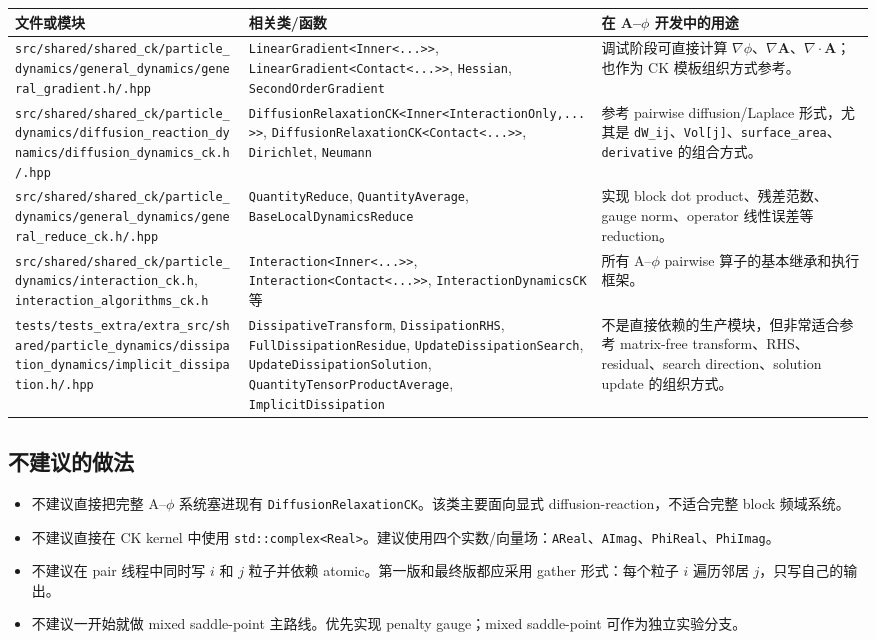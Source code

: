 \documentclass[UTF8,a4paper,11pt]{ctexart}
\newcommand{\code}[1]{\texttt{#1}}
\begin{document}
\begin{longtable}{p{}p{}p{}}
\toprule
文件或模块 & 相关类/函数 & 在 A--$\phi$ 开发中的用途 \\
\midrule
\code{src/shared/shared\_ck/particle\_dynamics/general\_dynamics/general\_gradient.h/.hpp}
& \code{LinearGradient<Inner<...>>}, \code{LinearGradient<Contact<...>>}, \code{Hessian}, \code{SecondOrderGradient}
& 调试阶段可直接计算 $\nabla\phi$、$\nabla \bm A$、$\nabla\cdot\bm A$；也作为 CK 模板组织方式参考。 \\
\midrule
\code{src/shared/shared\_ck/particle\_dynamics/diffusion\_reaction\_dynamics/diffusion\_dynamics\_ck.h/.hpp}
& \code{DiffusionRelaxationCK<Inner<InteractionOnly,...>>}, \code{DiffusionRelaxationCK<Contact<...>>}, \code{Dirichlet}, \code{Neumann}
& 参考 pairwise diffusion/Laplace 形式，尤其是 \code{dW\_ij}、\code{Vol[j]}、\code{surface\_area}、\code{derivative} 的组合方式。 \\
\midrule
\code{src/shared/shared\_ck/particle\_dynamics/general\_dynamics/general\_reduce\_ck.h/.hpp}
& \code{QuantityReduce}, \code{QuantityAverage}, \code{BaseLocalDynamicsReduce}
& 实现 block dot product、残差范数、gauge norm、operator 线性误差等 reduction。 \\
\midrule
\code{src/shared/shared\_ck/particle\_dynamics/interaction\_ck.h}, \code{interaction\_algorithms\_ck.h}
& \code{Interaction<Inner<...>>}, \code{Interaction<Contact<...>>}, \code{InteractionDynamicsCK} 等
& 所有 A--$\phi$ pairwise 算子的基本继承和执行框架。 \\
\midrule
\code{tests/tests\_extra/extra\_src/shared/particle\_dynamics/dissipation\_dynamics/implicit\_dissipation.h/.hpp}
& \code{DissipativeTransform}, \code{DissipationRHS}, \code{FullDissipationResidue}, \code{UpdateDissipationSearch}, \code{UpdateDissipationSolution}, \code{QuantityTensorProductAverage}, \code{ImplicitDissipation}
& 不是直接依赖的生产模块，但非常适合参考 matrix-free transform、RHS、residual、search direction、solution update 的组织方式。 \\
\bottomrule
\end{longtable}

\subsection{不建议的做法}

\begin{itemize}
  \item 不建议直接把完整 A--$\phi$ 系统塞进现有 \code{DiffusionRelaxationCK}。该类主要面向显式 diffusion-reaction，不适合完整 block 频域系统。
  \item 不建议直接在 CK kernel 中使用 \code{std::complex<Real>}。建议使用四个实数/向量场：\code{AReal}、\code{AImag}、\code{PhiReal}、\code{PhiImag}。
  \item 不建议在 pair 线程中同时写 $i$ 和 $j$ 粒子并依赖 atomic。第一版和最终版都应采用 gather 形式：每个粒子 $i$ 遍历邻居 $j$，只写自己的输出。
  \item 不建议一开始就做 mixed saddle-point 主路线。优先实现 penalty gauge；mixed saddle-point 可作为独立实验分支。
\end{itemize}
\end{document}
